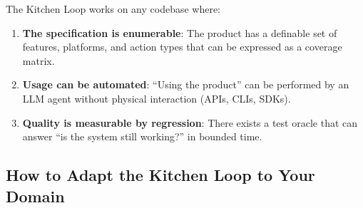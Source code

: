\documentclass[11pt,a4paper]{article}
\providecommand{\tightlist}{%
  \setlength{\itemsep}{0pt}\setlength{\parskip}{0pt}}
\begin{document}
The Kitchen Loop works on any codebase where:

\begin{enumerate}
\def\labelenumi{\arabic{enumi}.}
\tightlist
\item
  \textbf{The specification is enumerable}: The product has a definable set of features, platforms, and action types that can be expressed as a coverage matrix.
\item
  \textbf{Usage can be automated}: ``Using the product'' can be performed by an LLM agent without physical interaction (APIs, CLIs, SDKs).
\item
  \textbf{Quality is measurable by regression}: There exists a test oracle that can answer ``is the system still working?'' in bounded time.
\end{enumerate}

\subsection{How to Adapt the Kitchen Loop to Your Domain}\label{sec:how-to-adapt-the-kitchen-loop-to-your-domain}
\end{document}
